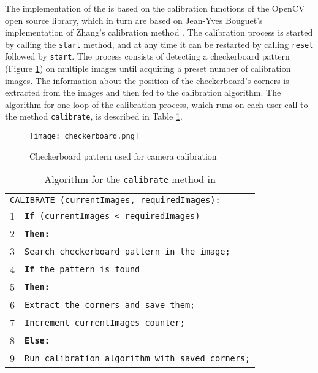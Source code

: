 The implementation of the \CalibrationTool{} is based on the calibration functions of the OpenCV open source 
library, which in turn are based on Jean-Yves Bouguet's implementation of Zhang's calibration method
\cite{Bouguet, Zhang}. The calibration process is started by calling the \texttt{start} method, and at any
time it can be restarted by calling \texttt{re\-set} followed by \texttt{start}. The process consists of detecting a 
checkerboard pattern (Figure \ref{checkerboard}) on multiple images until acquiring a preset number of 
calibration images. The information about the position of the checkerboard's corners is extracted from the 
images and then fed to the calibration algorithm. The algorithm for one loop of the calibration process, which 
runs on each user call to the method \texttt{cal\-i\-brate}, is described in Table \ref{calibratealgorithm}.

\begin{figure}[t]
\begin{center}
\texttt{[image: checkerboard.png]}
\caption{Checkerboard pattern used for camera calibration}
\label{checkerboard}
\end{center}
\end{figure}

\begin{table}[ht]
\caption{Algorithm for the \texttt{calibrate} method in \CalibrationTool{}}
\begin{center}
\begin{tabular}{ l l }
\hline
\multicolumn{2}{l}{\texttt{CALIBRATE (currentImages, requiredImages):}} \\
1 & \texttt{{\bf If} (currentImages < requiredImages)} \\
2 & \hspace{0.6cm} \texttt{\bf Then:} \\
3 & \hspace{1.2cm} \texttt{Search checkerboard pattern in the image;} \\
4 & \hspace{1.2cm} \texttt{{\bf If} the pattern is found} \\
5 & \hspace{1.8cm} \texttt{\bf Then:} \\
6 & \hspace{2.4cm} \texttt{Extract the corners and save them;} \\
7 & \hspace{2.4cm} \texttt{Increment currentImages counter;} \\
8 & \hspace{0.6cm} \texttt{\bf Else:} \\
9 & \hspace{1.2cm} \texttt{Run calibration algorithm with saved corners;} \\
\hline
\end{tabular}
\end{center}
\label{calibratealgorithm}
\end{table}

